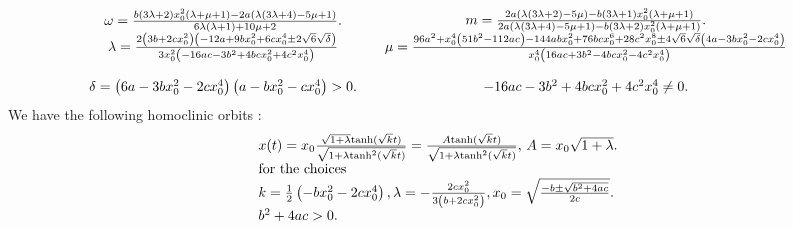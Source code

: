 \documentclass{ws-ijbc}
\begin{document}
\begin{equation}
\begin{array}{cc}
\begin{array}{c}
\omega =\frac{b(3\lambda +2)x_{0}^{2}(\lambda +\mu +1)-2a(\lambda (3\lambda
+4)-5\mu +1)}{6\lambda (\lambda +1)+10\mu +2}. \\ 
\end{array}
& 
\begin{array}{c}
m=\frac{2a(\lambda (3\lambda +2)-5\mu )-b(3\lambda +1)x_{0}^{2}(\lambda +\mu
+1)}{2a(\lambda (3\lambda +4)-5\mu +1)-b(3\lambda +2)x_{0}^{2}(\lambda +\mu
+1)}. \\ 
\end{array}
\\ 
\begin{array}{c}
\lambda =\frac{2\left( 3b+2cx_{0}^{2}\right) \left(
-12a+9bx_{0}^{2}+6cx_{0}^{4}\pm 2\sqrt{6}\sqrt{\delta }\right) }{%
3x_{0}^{2}\left( -16ac-3b^{2}+4bcx_{0}^{2}+4c^{2}x_{0}^{4}\right) } \\ 
\\ 
\delta =\left( 6a-3bx_{0}^{2}-2cx_{0}^{4}\right) \left(
a-bx_{0}^{2}-cx_{0}^{4}\right) >0.%
\end{array}
& 
\begin{array}{c}
\mu =\frac{96a^{2}+x_{0}^{4}\left( 51b^{2}-112ac\right)
-144abx_{0}^{2}+76bcx_{0}^{6}+28c^{2}x_{0}^{8}\pm 4\sqrt{6}\sqrt{\delta }%
\left( 4a-3bx_{0}^{2}-2cx_{0}^{4}\right) }{x_{0}^{4}\left(
16ac+3b^{2}-4bcx_{0}^{2}-4c^{2}x_{0}^{4}\right) } \\ 
\\ 
-16ac-3b^{2}+4bcx_{0}^{2}+4c^{2}x_{0}^{4}\neq 0.%
\end{array}%
\end{array}
\label{x5}
\end{equation}%
We have the following homoclinic orbits : 
\begin{equation}
\begin{tabular}{l}
$x(t)=x_{0}\frac{\sqrt{1+\lambda }\text{tanh}(\sqrt{k}t)}{\sqrt{1+\lambda 
\text{tanh}^{2}(\sqrt{k}t)}}=\frac{A\text{tanh}(\sqrt{k}t)}{\sqrt{1+\lambda 
\text{tanh}^{2}(\sqrt{k}t)}}$, $A=x_{0}\sqrt{1+\lambda }.$ \\ 
for the choices \\ 
$k=\frac{1}{2}\left( -bx_{0}^{2}-2cx_{0}^{4}\right) ,\lambda =-\frac{%
2cx_{0}^{2}}{3\left( b+2cx_{0}^{2}\right) },x_{0}=\sqrt{\frac{-b\pm \sqrt{%
b^{2}+4ac}}{2c}}.$ \\ 
$b^{2}+4ac>0.$%
\end{tabular}
\label{x6}
\end{equation}%
\end{document}
